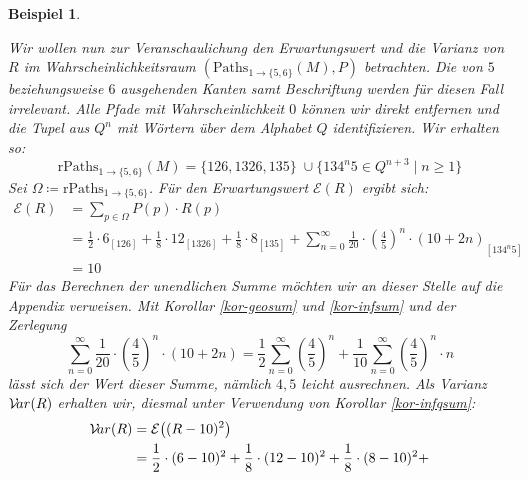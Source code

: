 \documentclass[a4paper]{article}
\newtheorem{beispiel}[satz]{Beispiel}
\theoremstyle{nonumberplain}
\begin{document}
\begin{beispiel}
\begin{center}
	\end{center}
	Wir wollen nun zur Veranschaulichung den Erwartungswert und die Varianz von $R$ im Wahrscheinlichkeitsraum $(\mathrm{Paths}_{1 \rightarrow \{5,6\}}(M), P)$ betrachten. Die von $5$ beziehungsweise $6$ ausgehenden Kanten samt Beschriftung werden für diesen Fall irrelevant. Alle Pfade mit Wahrscheinlichkeit $0$ können wir direkt entfernen und die Tupel aus $Q^n$ mit Wörtern über dem Alphabet $Q$ identifizieren. Wir erhalten so:
	\begin{equation*}
	\mathrm{rPaths}_{1 \rightarrow \{5,6\}}(M) = \big\{126,1326,135\big\} \; \cup \big\{134^n5 \in Q^{n+3} \mid n\geq 1\big\} 
	\end{equation*}
	Sei $\Omega \coloneqq \mathrm{rPaths}_{1 \rightarrow \{5,6\}}$. Für den Erwartungswert $\mathcal{E}(R)$ ergibt sich:
	\newcommand{\exres}{10}
	\begin{align*}
	\mathcal{E}(R) & = \sum_{p \in \Omega}{P(p) \cdot R(p)}\\
	& = \frac{1}{2}\cdot 6_{\scriptscriptstyle [126]} + \frac{1}{8}\cdot 12_{\scriptscriptstyle [1326]} + \frac{1}{8}\cdot 8_{\scriptscriptstyle [135]} + \sum_{n = 0}^{\infty}{\frac{1}{20}\cdot\left(\frac{4}{5}\right)^n \cdot (10 + 2n)}_{\scriptscriptstyle [134^n5]} \\
	& = \exres{}
	\end{align*}
	Für das Berechnen der unendlichen Summe möchten wir an dieser Stelle auf die Appendix verweisen. Mit Korollar \ref{kor-geosum} und \ref{kor-infsum} und der Zerlegung
	\begin{equation*}
		\sum_{n = 0}^{\infty}{\frac{1}{20}\cdot\left(\frac{4}{5}\right)^n \cdot (10 + 2n)}
		= \frac{1}{2}\sum_{n = 0}^{\infty}{\left(\frac{4}{5}\right)^n} + \frac{1}{10} \sum_{n = 0}^{\infty}{\left(\frac{4}{5}\right)^n \cdot n}
	\end{equation*}
	lässt sich der Wert dieser Summe, nämlich $4,5$ leicht ausrechnen.
	Als Varianz $\mathcal{V}\!ar(R)$ erhalten wir, diesmal unter Verwendung von Korollar \ref{kor-infqsum}:
	\begin{align*}
		\mvar(R) & = \mathcal{E}\big((R - \exres{})^2\big) \\
		& = \frac{1}{2}\cdot (6 - \exres)^2+ \frac{1}{8}\cdot (12-\exres)^2 + \frac{1}{8}\cdot (8-\exres)^2 + \\

\end{align*}
\end{beispiel}
\end{document}

